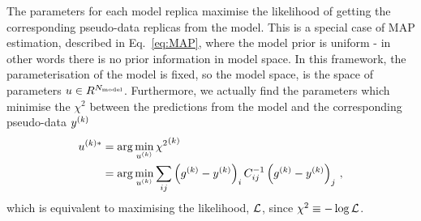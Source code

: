 The parameters for each model replica maximise the likelihood of getting the
corresponding pseudo-data replicas from the model. This is a special case of MAP
estimation, described in Eq.~\eqref{eq:MAP}, where the model prior is uniform -
in other words there is no prior information in model space. In this framework,
the parameterisation of the model is fixed, so the model space, is the space of
parameters $u \in R^{N_{\rm model}}$. Furthermore, we actually find the parameters
which minimise the $\chi^2$ between the predictions from the model and the
corresponding pseudo-data $y^{(k)}$
\begin{equation}
    \begin{split}
        u^{(k) *} &= \arg\min_{u^{(k)}} {\chi^2}^{(k)} \\
        &= \arg\min_{u^{(k)}} \sum_{ij} \left( g^{(k)} - y^{(k)} \right)_i C^{-1}_{ij} \left( g^{(k)} - y^{(k)} \right)_j\, ,
    \end{split}
\end{equation}
which is equivalent to maximising the likelihood, $\mathcal{L}$, since
$\chi^2 \equiv -\log{\mathcal{L}}$.

